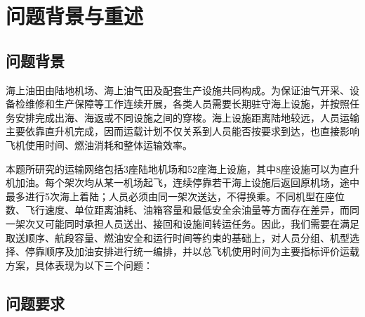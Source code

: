 \documentclass[UTF-8,a4paper,zihao=-4]{ctexart}
\begin{document}
\newpage
\section{问题背景与重述}
\subsection{问题背景}

海上油田由陆地机场、海上油气田及配套生产设施共同构成。为保证油气开采、设备检维修和生产保障等工作连续开展，各类人员需要长期驻守海上设施，并按照任务安排完成出海、海返或不同设施之间的穿梭。海上设施距离陆地较远，人员运输主要依靠直升机完成，因而运载计划不仅关系到人员能否按要求到达，也直接影响飞机使用时间、燃油消耗和整体运输效率。

本题所研究的运输网络包括3座陆地机场和52座海上设施，其中8座设施可以为直升机加油。每个架次均从某一机场起飞，连续停靠若干海上设施后返回原机场，途中最多进行5次海上着陆；人员必须由同一架次送达，不得换乘。不同机型在座位数、飞行速度、单位距离油耗、油箱容量和最低安全余油量等方面存在差异，而同一架次又可能同时承担人员送出、接回和设施间转运任务。因此，我们需要在满足取送顺序、航段容量、燃油安全和运行时间等约束的基础上，对人员分组、机型选择、停靠顺序及加油安排进行统一编排，并以总飞机使用时间为主要指标评价运载方案，具体表现为以下三个问题：

\subsection{问题要求}
\end{document}
